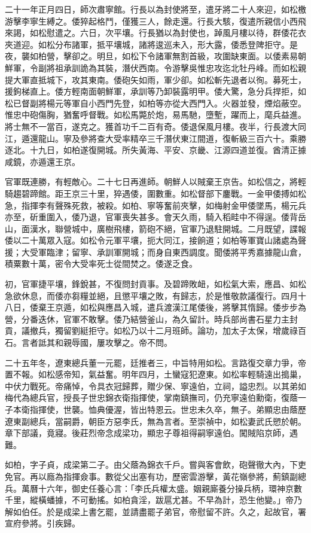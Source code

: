 \begin{pinyinscope}
二十一年正月四日，師次肅寧館。行長以為封使將至，遣牙將二十人來迎，如松檄游擊李寧生縛之。倭猝起格鬥，僅獲三人，餘走還。行長大駭，復遣所親信小西飛來謁，如松慰遣之。六日，次平壤。行長猶以為封使也，踔風月樓以待，群倭花衣夾道迎。如松分布諸軍，抵平壤城，諸將逡巡未入，形大露，倭悉登陴拒守。是夜，襲如柏營，擊卻之。明旦，如松下令諸軍無割首級，攻圍缺東面。以倭素易朝鮮軍，令副將祖承訓詭為其裝，潛伏西南。令游擊吳惟忠攻迄北牡丹峰。而如松親提大軍直抵城下，攻其東南。倭砲矢如雨，軍少卻。如松斬先退者以徇。募死士，援鉤梯直上。倭方輕南面朝鮮軍，承訓等乃卸裝露明甲。倭大驚，急分兵捍拒，如松已督副將楊元等軍自小西門先登，如柏等亦從大西門入。火器並發，煙焰蔽空。惟忠中砲傷胸，猶奮呼督戰。如松馬斃於炮，易馬馳，墮塹，躍而上，麾兵益進。將士無不一當百，遂克之。獲首功千二百有奇。倭退保風月樓。夜半，行長渡大同江，遁還龍山。寧及參將查大受率精卒三千潛伏東江間道，復斬級三百六十。乘勝逐北。十九日，如柏遂復開城。所失黃海、平安、京畿、江源四道並復。酋清正據咸鏡，亦遁還王京。

官軍既連勝，有輕敵心。二十七日再進師。朝鮮人以賊棄王京告。如松信之，將輕騎趨碧蹄館。距王京三十里，猝遇倭，圍數重。如松督部下鏖戰。一金甲倭搏如松急，指揮李有聲殊死救，被殺。如柏、寧等奮前夾擊，如梅射金甲倭墜馬，楊元兵亦至，斫重圍入，倭乃退，官軍喪失甚多。會天久雨，騎入稻畦中不得逞。倭背岳山，面漢水，聯營城中，廣樹飛樓，箭砲不絕，官軍乃退駐開城。二月既望，諜報倭以二十萬眾入寇。如松令元軍平壤，扼大同江，接餉道；如柏等軍寶山諸處為聲援；大受軍臨津；留寧、承訓軍開城；而身自東西調度。聞倭將平秀嘉據龍山倉，積粟數十萬，密令大受率死士從間焚之。倭遂乏食。

初，官軍捷平壤，鋒銳甚，不復問封貢事。及碧蹄敗衄，如松氣大索，應昌、如松急欲休息，而倭亦芻糧並絕，且懲平壤之敗，有歸志，於是惟敬款議復行。四月十八日，倭棄王京遁，如松與應昌入城，遣兵渡漢江尾倭後，將擊其惰歸。倭步步為營，分番迭休，官軍不敢擊。倭乃結營釜山，為久留計。時兵部尚書石星力主封貢，議撤兵，獨留劉綎拒守。如松乃以十二月班師。論功，加太子太保，增歲祿百石。言者詆其和親辱國，屢攻擊之。帝不問。

二十五年冬，遼東總兵董一元罷，廷推者三，中旨特用如松。言路復交章力爭，帝置不報。如松感帝知，氣益奮。明年四月，土蠻寇犯遼東。如松率輕騎遠出搗巢，中伏力戰死。帝痛悼，令具衣冠歸葬，贈少保、寧遠伯，立祠，謚忠烈。以其弟如梅代為總兵官，授長子世忠錦衣衛指揮使，掌南鎮撫司，仍充寧遠伯勳衛，復蔭一子本衛指揮使，世襲。恤典優渥，皆出特恩云。世忠未久卒，無子。弟顯忠由蔭歷遼東副總兵，當嗣爵，朝臣方惡李氏，無為言者。至崇禎中，如松妻武氏愬於朝。章下部議，竟寢。後莊烈帝念成梁功，顯忠子尊祖得嗣寧遠伯。闖賊陷京師，遇難。

如柏，字子貞，成梁第二子。由父蔭為錦衣千戶。嘗與客會飲，砲聲徹大內，下吏免官。再以廕為指揮僉事。數從父出塞有功，歷密雲游擊，黃花嶺參將，薊鎮副總兵。萬曆十六年，御史任養心言：「李氏兵權太盛。姻親廝養分操兵柄，環神京數千里，縱橫蟠據，不可動搖。如柏貪淫，跋扈尤甚。不早為計，恐生他變。」帝乃解如伯任。於是成梁上書乞罷，並請盡罷子弟官，帝慰留不許。久之，起故官，署宣府參將。引疾歸。


\end{pinyinscope}
